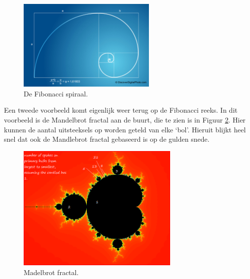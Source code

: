 \documentclass{article}
\begin{document}
\begin{figure}[Hh]
	\centering
	\includegraphics[width=0.6\textwidth]{fibonacci_good1.jpg}
	\caption{De Fibonacci spiraal.}
	\label{fig:spiral}
\end{figure}

Een tweede voorbeeld komt eigenlijk weer terug op de Fibonacci reeks. In dit voorbeeld is de Mandelbrot fractal aan de buurt, die te zien is in Figuur \ref{fig:mandlebrot}. Hier kunnen de aantal uitsteeksels op worden geteld van elke `bol'. Hieruit blijkt heel snel dat ook de Mandlebrot fractal gebaseerd is op de gulden snede.

\begin{figure}[Hh]
	\centering
	\includegraphics[width=0.7\textwidth]{mandlebrot5.png}
	\caption{Madelbrot fractal.}
	\label{fig:mandlebrot}
\end{figure}
\end{document}
